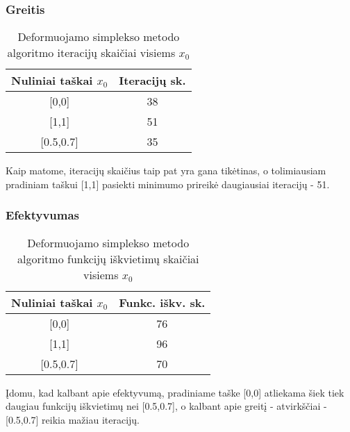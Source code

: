 \documentclass{article}
\begin{document}
\subsubsection{Greitis}
\begin{table}[H]
    \centering
    \begin{tabular}{|c|c|} 
    \hline
    Nuliniai taškai $x_{0}$ & Iteracijų sk.  \\ 
    \hline
    {[}0,0]            & 38             \\ 
    \hline
    {[}1,1]            & 51             \\ 
    \hline
    {[}0.5,0.7]        & 35             \\
    \hline
    \end{tabular}
    \caption{Deformuojamo simplekso metodo algoritmo iteracijų skaičiai visiems $x_{0}$}
    \label{table:11}
\end{table}
Kaip matome, iteracijų skaičius taip pat yra gana tikėtinas, o tolimiausiam pradiniam taškui [1,1] pasiekti minimumo prireikė daugiausiai iteracijų - 51.
\subsubsection{Efektyvumas}
\begin{table}[H]
    \centering
    \begin{tabular}{|c|c|} 
    \hline
    Nuliniai taškai $x_{0}$ & Funkc. iškv. sk.  \\ 
    \hline
    {[}0,0]            & 76                \\ 
    \hline
    {[}1,1]            & 96                \\ 
    \hline
    {[}0.5,0.7]        & 70                \\
    \hline
    \end{tabular}
    \caption{Deformuojamo simplekso metodo algoritmo funkcijų iškvietimų skaičiai visiems $x_{0}$}
    \label{table:12}
\end{table}
Įdomu, kad kalbant apie efektyvumą, pradiniame taške [0,0] atliekama šiek tiek daugiau funkcijų iškvietimų nei [0.5,0.7], o kalbant apie greitį - atvirkščiai - [0.5,0.7] reikia mažiau iteracijų.
\end{document}
